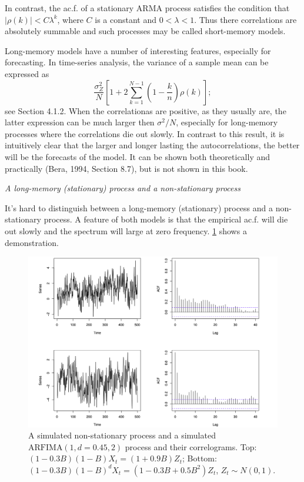 In contrast, the ac.f. of a stationary ARMA process satisfies the condition that $|\rho(k)| < C \lambda^k$, 
where $C$ is a constant and $0 < \lambda < 1$. Thus there correlations are absolutely summable and such 
processes may be called short-memory models.

Long-memory models have a number of interesting features, especially for forecasting. In time-series analysis, 
the variance of a sample mean can be expressed as 
\[ \frac{\sigma_Z^2}{N} [1 + 2 \sum_{k = 1}^{N - 1} \left( 1 - \frac{k}{n} \right) \rho(k)]; \]
see Section 4.1.2. When the correlationas are positive, as they usually are, the latter expression can be much 
larger then $\sigma^2 / N$, especially for long-memory processes where the correlations die out slowly. In 
contrast to this result, it is intuitively clear that the larger and longer lasting the autocorrelations, the 
better will be the forecasts of the model. It can be shown both theoretically and practically (Bera, 1994, 
Section 8.7), but is not shown in this book.

\textit{A long-memory (stationary) process and a non-stationary process}

It's hard to distinguish between a long-memory (stationary) process and a non-stationary process. A feature of 
both models is that the empirical ac.f. will die out slowly and the spectrum will large at zero frequency. 
\cref{fig:3.9} shows a demonstration. 

\begin{figure}[h]
	\centering
	\includegraphics[width=\textwidth]{Chapter 3/fig3-9.png}
	\caption{A simulated non-stationary process and a simulated $\mathrm{ARFIMA}(1, d=0.45, 2)$ process and 
	their correlograms. Top: $(1 - 0.3B)(1 - B)X_t = (1 + 0.9B)Z_t$; Bottom: $(1 - 0.3B)(1 - B)^d X_t 
	= (1 - 0.3B + 0.5B^2) Z_t$, $Z_t \sim N(0, 1)$.}
	\label{fig:3.9}
\end{figure}

